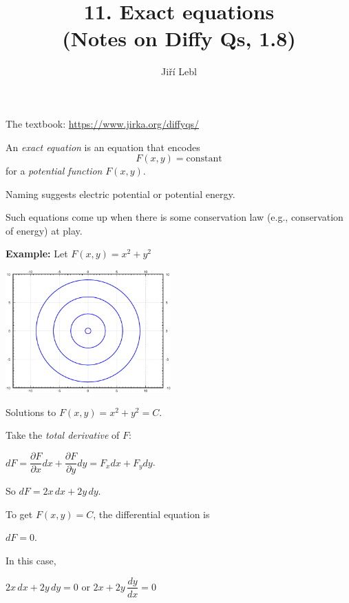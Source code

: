 \documentclass[10pt,aspectratio=169]{beamer}
\author{Ji\v{r}\'i Lebl}
\institute[OSU]{%
Oklahoma State University%
}
\title{11. Exact equations\\(Notes on Diffy Qs, 1.8)}
\date{}
\begin{document}
\begin{frame}
\titlepage


\begin{center}
The textbook: \url{https://www.jirka.org/diffyqs/}
\end{center}
\end{frame}

\begin{frame}
An \emph{exact equation} is an equation that encodes 
\[
F(x,y) = \text{constant}
\]
for a \emph{potential function} $F(x,y)$.

\medskip
\pause

Naming suggests electric potential or potential energy.

\medskip
\pause

Such equations come up when there is some conservation
law (e.g., conservation of energy) at play.

\end{frame}

\begin{frame}
\textbf{Example:}
Let $F(x,y) = x^2+y^2$

\vspace*{-\baselineskip}
\hspace*{3in}%
\includegraphics[width=2.5in]{../figures/circlesfig}

\hspace*{3in}%
Solutions to $F(x,y) = x^2+y^2 = C$.

\vspace*{-1.8in}

\pause

Take the
\emph{total derivative} of
$F$:

\medskip
\quad
$dF =
\dfrac{\partial F}{\partial x} dx + \dfrac{\partial F}{\partial y} dy
=
F_x dx + F_y dy
$.

\medskip
\pause
So
$dF = 2x \, dx + 2y \, dy$.

\medskip
\pause

To get $F(x,y) = C$, the differential equation is

\medskip

\quad $dF = 0$.

\medskip
\pause

In this case,

\medskip

\quad
$2x \, dx + 2y \, dy = 0$
\quad
or
\quad
$2x + 2y \, \dfrac{dy}{dx} = 0$
\end{frame}
\end{document}

